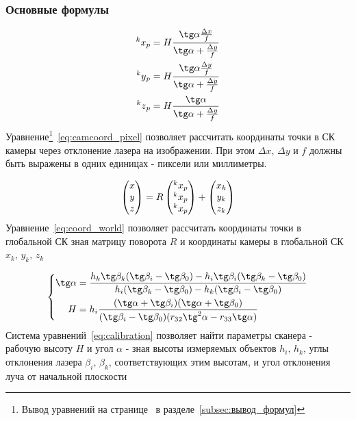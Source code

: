 \documentclass[a4paper, 12pt]{article}
\begin{document}
    \subsubsection{Основные формулы}
    \begin{equation}
        \label{eq:camcoord_pixel}
        \begin{aligned}
            \prescript{k}{}{x}_p = H\frac{\tg\alpha\frac{\Delta x}{f}}{\tg\alpha+\frac{\Delta y}{f}}\\
            \prescript{k}{}{y}_p = H\frac{\tg\alpha\frac{\Delta y}{f}}{\tg\alpha+\frac{\Delta y}{f}}\\
            \prescript{k}{}{z}_p = H\frac{\tg\alpha}{\tg\alpha+\frac{\Delta y}{f}}
        \end{aligned}
    \end{equation}
    Уравнение\footnote{Вывод уравнений на странице~\pageref{subsec:вывод_формул} в разделе~\ref{subsec:вывод_формул}}~\eqref{eq:camcoord_pixel} позволяет рассчитать координаты точки в СК камеры через отклонение лазера на изображении.
    При этом $\Delta x$, $\Delta y$ и $f$ должны быть выражены в одних единицах - пиксели или миллиметры.

    \begin{equation}
        \label{eq:coord_world}
        \begin{pmatrix}
            x\\y\\z
        \end{pmatrix}
        =
        R
        \begin{pmatrix}
            \prescript{k}{}{x}_p\\
            \prescript{k}{}{x}_p\\
            \prescript{k}{}{x}_p
        \end{pmatrix}
        +
        \begin{pmatrix}
            x_k\\y_k\\z_k
        \end{pmatrix}
    \end{equation}
    Уравнение~\eqref{eq:coord_world} позволяет рассчитать координаты точки в глобальной СК зная матрицу поворота $R$ и координаты камеры в глобальной СК $x_k,\,y_k,\,z_k$

    \begin{equation}
        \label{eq:calibration}
        \left\{
        \begin{aligned}
            \tg\alpha &= \frac{h_k\tg\beta_k(\tg\beta_i-\tg\beta_0) - h_i\tg\beta_i(\tg\beta_k-\tg\beta_0)}{h_i(\tg\beta_k-\tg\beta_0) - h_k(\tg\beta_i-\tg\beta_0)}\\
            H &= h_i\frac{(\tg\alpha + \tg\beta_i)(\tg\alpha + \tg\beta_0)}{(\tg\beta_i - \tg\beta_0)(r_{32}\tg^2\alpha-r_{33}\tg\alpha)}
        \end{aligned}
        \right.
    \end{equation}
    Система уравнений~\eqref{eq:calibration} позволяет найти параметры сканера - рабочую высоту $H$ и угол $\alpha$ - зная высоты измеряемых объектов $h_i,\,h_k$, углы отклонения лазера $\beta_i,\,\beta_k$, соответствующих этим высотам, и угол отклонения луча от начальной плоскости
\end{document}
